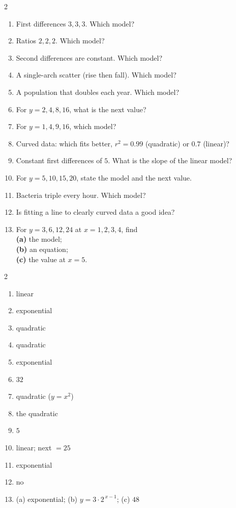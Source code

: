 \documentclass[11pt]{article}
\begin{document}
\clearpage
{}

\begin{recapbox}
\begin{multicols}{2}
\small
\begin{enumerate}[leftmargin=*,itemsep=3pt]
  \item First differences $3,3,3$. Which model?
  \item Ratios $2,2,2$. Which model?
  \item Second differences are constant. Which model?
  \item A single-arch scatter (rise then fall). Which model?
  \item A population that doubles each year. Which model?
  \item For $y=2,4,8,16$, what is the next value?
  \item For $y=1,4,9,16$, which model?
  \item Curved data: which fits better, $r^{2}=0.99$ (quadratic) or $0.7$ (linear)?
  \item Constant first differences of $5$. What is the slope of the linear model?
  \item For $y=5,10,15,20$, state the model and the next value.
  \item Bacteria triple every hour. Which model?
  \item Is fitting a line to clearly curved data a good idea?
  \item For $y=3,6,12,24$ at $x=1,2,3,4$, find \\ \textbf{(a)} the model; \\ \textbf{(b)} an equation; \\ \textbf{(c)} the value at $x=5$.
\end{enumerate}
\end{multicols}
\end{recapbox}

\begin{keybox}
\begin{multicols}{2}
\small
\begin{enumerate}[leftmargin=*,itemsep=3pt]
  \item linear
  \item exponential
  \item quadratic
  \item quadratic
  \item exponential
  \item $32$
  \item quadratic ($y=x^{2}$)
  \item the quadratic
  \item $5$
  \item linear; next $=25$
  \item exponential
  \item no
  \item (a) exponential; (b) $y=3\cdot2^{\,x-1}$; (c) $48$
\end{enumerate}
\end{multicols}
\end{keybox}
\end{document}
